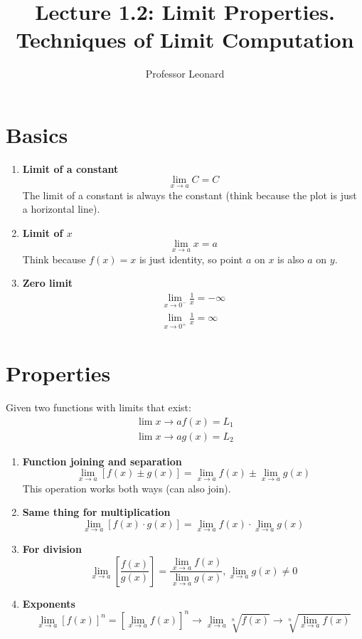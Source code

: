 \documentclass{article}
\begin{document}
\title{Lecture 1.2: Limit Properties. Techniques of Limit Computation}
\author{Professor Leonard}
\maketitle

\section{Basics}

\begin{enumerate}
    \item \textbf{Limit of a constant}
$$
\lim_{x \to a} C = C
$$
The limit of a constant is always the constant (think because the plot is just a
horizontal line).

    \item \textbf{Limit of $x$}
        $$
        \lim_{x\to a} x = a
        $$
        Think because $f(x) = x$ is just identity, so point $a$ on $x$ is also $a$ on $y$.

    \item \textbf{Zero limit}
        \begin{align*}
            \lim_{x\to 0^-} \frac{1}{x}= -\infty\\
            \lim_{x\to 0^+} \frac{1}{x} = \infty
        \end{align*}

\end{enumerate}

\section{Properties}

Given two functions with limits that exist:
\begin{align*}
    \lim{x\to a}f(x) = L_1\\
    \lim{x\to a} g(x) = L_2
\end{align*}

\begin{enumerate}
    \item \textbf{Function joining and separation}
        $$
        \lim_{x\to a} [f(x) \pm g(x)] = \lim_{x\to a}f(x) \pm \lim_{x\to a}g(x)
        $$
        This operation works both ways (can also join).

    \item \textbf{Same thing for multiplication}
        $$
        \lim_{x\to a} [f(x) \cdot g(x)] = \lim_{x\to a}f(x) \cdot \lim_{x\to a}g(x)
        $$
    \item \textbf{For division}
        $$
        \lim_{x\to a} \left[ \frac{f(x)}{g(x)} \right] = \frac{\lim_{x\to
        a}f(x)}{\lim_{x\to a}g(x)}, \lim_{x\to a}g(x) \neq 0
        $$

    \item \textbf{Exponents}
        $$
        \lim_{x\to a}[f(x)]^n = \left[\lim_{x\to a} f(x) \right]^n \rightarrow \lim_{x\to
        a} \sqrt[n]{f(x)} \rightarrow \sqrt[n]{\lim_{x\to a}f(x)}
        $$

\end{enumerate}
\end{document}
